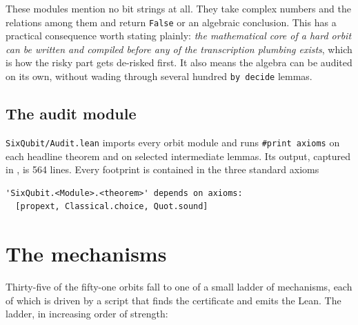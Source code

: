 \documentclass[11pt,a4paper]{article}
\newcommand{\lean}[1]{\texttt{#1}}
\theoremstyle{definition}
\begin{document}
These modules mention no bit strings at all. They take complex numbers and the
relations among them and return \lean{False} or an algebraic conclusion. This has
a practical consequence worth stating plainly: \emph{the mathematical core of a
hard orbit can be written and compiled before any of the transcription
plumbing exists}, which is how the risky part gets de-risked first. It also means
the algebra can be audited on its own, without wading through several hundred
\lean{by decide} lemmas.

\subsection{The audit module}

\lean{SixQubit/Audit.lean} imports every orbit module and runs
\lean{\#print axioms} on each headline theorem and on selected intermediate
lemmas. Its output, captured in , is 564 lines.
Every footprint is contained in the three standard axioms
\begin{lstlisting}
'SixQubit.<Module>.<theorem>' depends on axioms:
  [propext, Classical.choice, Quot.sound]
\end{lstlisting}

\section{The mechanisms}

Thirty-five of the fifty-one orbits fall to one of a small ladder of
mechanisms, each of which is driven by a script that finds the certificate and
emits the Lean. The ladder, in increasing order of strength:
\end{document}

